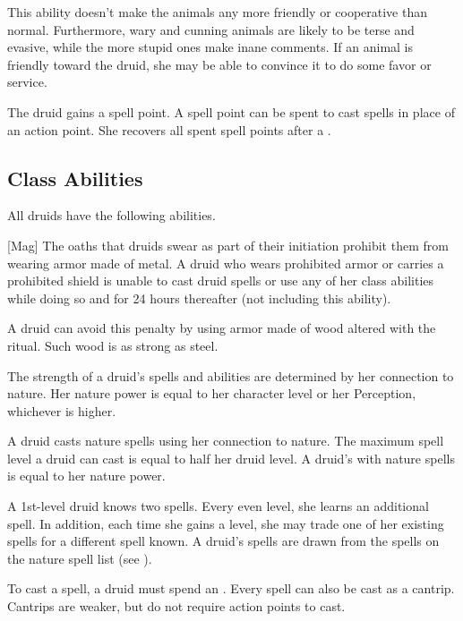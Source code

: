        This ability doesn't make the animals any more friendly or cooperative than normal.
        Furthermore, wary and cunning animals are likely to be terse and evasive, while the more stupid ones make inane comments.
        If an animal is friendly toward the druid, she may be able to convince it to do some favor or service.

        The druid gains a spell point.
        A spell point can be spent to cast spells in place of an action point.
        She recovers all spent spell points after a .

    \subsection{Class Abilities}
        All druids have the following abilities.

        [Mag]
        The oaths that druids swear as part of their initiation prohibit them from wearing armor made of metal.
        A druid who wears prohibited armor or carries a prohibited shield is unable to cast druid spells or use any of her  class abilities while doing so and for 24 hours thereafter (not including this ability).
        
        A druid can avoid this penalty by using armor made of wood altered with the  ritual.
        Such wood is as strong as steel.

        The strength of a druid's spells and abilities are determined by her connection to nature.
        Her nature power is equal to her character level or her Perception, whichever is higher.

        A druid casts nature spells using her connection to nature.
        The maximum spell level a druid can cast is equal to half her druid level.
        A druid's  with nature spells is equal to her nature power.

        A 1st-level druid knows two spells.
        Every even level, she learns an additional spell.
        In addition, each time she gains a level, she may trade one of her existing spells for a different spell known.
        A druid's spells are drawn from the spells on the nature spell list (see ).

        To cast a spell, a druid must spend an .
        Every spell can also be cast as a cantrip.
        Cantrips are weaker, but do not require action points to cast.

